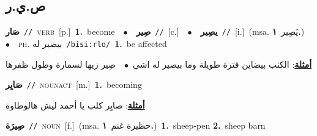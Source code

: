 \documentclass[10pt,a4paper,twoside]{article} %
\begin{document}
\begin{multicols}{2}
\vspace{-3mm}
\subsection*{\color{blue}\foreignlanguage{arabic}{ص.ي.ر}\color{blue}{}} 

{\setlength\topsep{0pt}\textbf{\foreignlanguage{arabic}{صَار}}\ {\color{gray}\texttt{//}\color{black}}\ \textsc{verb}\ [p.]\ \textbf{1.}~become\ \ $\bullet$\ \ \setlength\topsep{0pt}\textbf{\foreignlanguage{arabic}{صِير}}\ {\color{gray}\texttt{//}\color{black}}\ [c.]\ \ $\bullet$\ \ \setlength\topsep{0pt}\textbf{\foreignlanguage{arabic}{يصِير}}\ {\color{gray}\texttt{//}\color{black}}\ [i.]\ \color{gray}(msa. \foreignlanguage{arabic}{يَصِير}~\foreignlanguage{arabic}{\textbf{١.}})\color{black}\ \ $\bullet$\ \ \textsc{ph.} \color{gray} \foreignlanguage{arabic}{بيصير له}\color{black}\ {\color{gray}\texttt{/{\sffamily bisiːrlo}/}\color{black}}\ \textbf{1.}~be affected\  \begin{flushright}\color{gray}\foreignlanguage{arabic}{\textbf{\underline{\foreignlanguage{arabic}{أمثلة}}}: الكنب بيضاين فترة طويلة وما بيصير له اشي\ $\bullet$\ \  صِير زيها لسمارة وطول ظفرها}\end{flushright}\color{black}} \vspace{2mm}

{\setlength\topsep{0pt}\textbf{\foreignlanguage{arabic}{صَايِر}}\ {\color{gray}\texttt{//}\color{black}}\ \textsc{noun\textunderscore act}\ [m.]\ \textbf{1.}~becoming\  \begin{flushright}\color{gray}\foreignlanguage{arabic}{\textbf{\underline{\foreignlanguage{arabic}{أمثلة}}}: صايِر كلب يا أحمد ليش هالوطاوة}\end{flushright}\color{black}} \vspace{2mm}

{\setlength\topsep{0pt}\textbf{\foreignlanguage{arabic}{صِيرَة}}\ {\color{gray}\texttt{//}\color{black}}\ \textsc{noun}\ [f.]\ \color{gray}(msa. \foreignlanguage{arabic}{حظيرة غنم}~\foreignlanguage{arabic}{\textbf{١.}})\color{black}\ \textbf{1.}~sheep-pen  \textbf{2.}~sheep barn\ } \vspace{2mm}


\end{multicols}
\end{document}
